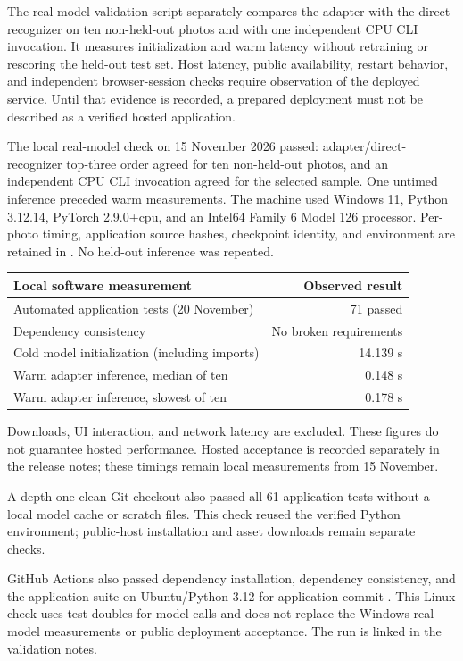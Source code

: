 \documentclass[11pt,a4paper]{article}
\newcommand{\code}[1]{\texttt{\detokenize{#1}}}
\begin{document}
The real-model validation script separately compares the adapter with the direct
recognizer on ten non-held-out photos and with one independent CPU CLI invocation.
It measures initialization and warm latency without retraining or rescoring the
held-out test set. Host latency, public availability, restart behavior, and
independent browser-session checks require observation of the deployed service.
Until that evidence is recorded, a prepared deployment must not be described as
a verified hosted application.

The local real-model check on 15 November 2026 passed: adapter/direct-recognizer
top-three order agreed for ten non-held-out photos, and an independent CPU CLI
invocation agreed for the selected sample. One untimed inference preceded warm
measurements. The machine used Windows 11, Python 3.12.14, PyTorch 2.9.0+cpu,
and an Intel64 Family 6 Model 126 processor. Per-photo timing, application source
hashes, checkpoint identity, and environment are retained in
\code{docs/app_validation.json}. No held-out inference was repeated.

\begin{center}\begin{tabularx}{\linewidth}{Xr}
\toprule Local software measurement & Observed result\\\midrule
Automated application tests (20 November) & 71 passed\\
Dependency consistency & No broken requirements\\
Cold model initialization (including imports) & 14.139 s\\
Warm adapter inference, median of ten & 0.148 s\\
Warm adapter inference, slowest of ten & 0.178 s\\
\bottomrule\end{tabularx}\end{center}
Downloads, UI interaction, and network latency are excluded. These figures do not
guarantee hosted performance. Hosted acceptance is recorded separately in the
release notes; these timings remain local measurements from 15 November.

A depth-one clean Git checkout also passed all 61 application tests without a
local model cache or scratch files. This check reused the verified Python
environment; public-host installation and asset downloads remain separate checks.

GitHub Actions also passed dependency installation, dependency consistency, and
the application suite on Ubuntu/Python 3.12 for application commit
\code{52cd7ae}. This Linux check uses test doubles for model calls and does not
replace the Windows real-model measurements or public deployment acceptance.
The run is linked in the validation notes.
\end{document}
